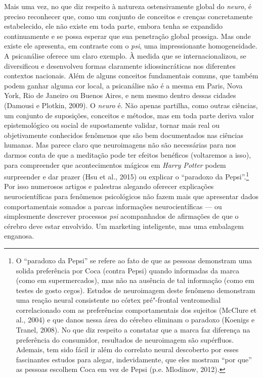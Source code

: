 Mais uma vez, no que diz respeito à natureza ostensivamente global do
\emph{neuro}, é preciso reconhecer que, como um conjunto de conceitos e
crenças concretamente estabelecido, ele não existe em toda parte, embora
tenha se expandido continuamente e se possa esperar que sua penetração
global prossiga. Mas onde existe ele apresenta, em contraste com o
\emph{psi}, uma impressionante homogeneidade. A psicanálise oferece um
claro exemplo. À medida que se internacionalizou, se diversificou e
desenvolveu formas claramente idiossincráticas nos diferentes contextos
nacionais. Além de alguns conceitos fundamentais comuns, que também
podem ganhar alguma cor local, a psicanálise não é a mesma em Paris,
Nova York, Rio de Janeiro ou Buenos Aires, e nem mesmo dentro dessas
cidades (Damousi e Plotkin, 2009). O \emph{neuro} é. Não apenas
partilha, como outras ciências, um conjunto de suposições, conceitos e
métodos, mas em toda parte deriva valor epistemológico ou social de
supostamente validar, tornar mais real ou objetivamente conhecidos
fenômenos que são bem documentados nas ciências humanas. Mas parece
claro que neuroimagens não são necessárias para nos darmos conta de que
a meditação pode ter efeitos benéficos (voltaremos a isso), para
compreender que acontecimentos mágicos em \emph{Harry Potter} podem
surpreender e dar prazer (Hsu et al., 2015) ou explicar o ``paradoxo da
Pepsi''.\footnote[8]{O ``paradoxo da Pepsi'' se refere ao fato de que as pessoas
demonstram uma solida preferência por Coca (contra Pepsi) quando
informadas da marca (como em supermercados), mas não na ausência de tal
informação (como em testes de gosto cegos). Estudos de neuroimagem deste
fenômeno demonstram uma reação neural consistente no córtex pré"-frontal
ventromedial correlacionado com as preferências comportamentais dos
sujeitos (McClure et al., 2004) e que danos nessa área do cérebro
eliminam o paradoxo (Koenigs e Tranel, 2008). No que diz respeito a
constatar que a marca faz diferença na preferência do consumidor,
resultados de neuroimagem são supérfluos. Ademais, tem sido fácil ir
além do correlato neural descoberto por esses fascinantes estudos para
alegar, indevidamente, que eles mostram ``por que'' as pessoas escolhem
Coca em vez de Pepsi (p.e. Mlodinow, 2012).} Por isso numerosos artigos e palestras
alegando oferecer explicações neurocientíficas para fenômenos
psicológicos não fazem mais que apresentar dados comportamentais somados
a parcas informações neurocientíficas --- ou simplesmente descrever
processos \emph{psi} acompanhados de afirmações de que o cérebro deve
estar envolvido. Um marketing inteligente, mas uma embalagem enganosa.

